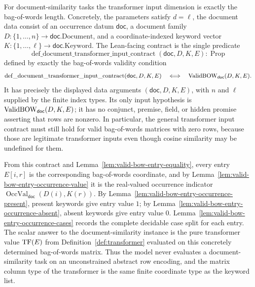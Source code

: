 \begin{definition}
  \label{def:document-transformer-input-contract}
  For document-similarity tasks the transformer input dimension is exactly the
  bag-of-words length.  Concretely, the parameters satisfy $d=\ell$, the
  document data consist of an occurrence datum $\mathsf{doc}$, a document
  family $D:\{1,\ldots,n\}\to\mathsf{doc}.\mathrm{Document}$, and a coordinate-indexed
  keyword vector $K:\{1,\ldots,\ell\}\to\mathsf{doc}.\mathrm{Keyword}$.
  The Lean-facing contract is the single predicate
  \[
    \operatorname{def\_document\_transformer\_input\_contract}
      (\mathsf{doc},D,K,E) : \operatorname{Prop}
  \]
  defined by exactly the bag-of-words validity condition
  \[
    \operatorname{def\_document\_transformer\_input\_contract}
      (\mathsf{doc},D,K,E)
      \quad\Longleftrightarrow\quad
    \operatorname{ValidBOW}_{\mathsf{doc}}(D,K,E).
  \]
  It has precisely the displayed data arguments $(\mathsf{doc},D,K,E)$, with
  $n$ and $\ell$ supplied by the finite index types.  Its only input hypothesis
  is $\operatorname{ValidBOW}_{\mathsf{doc}}(D,K,E)$; it has no conjunct, premise, field, or
  hidden promise asserting that rows are nonzero.  In particular, the general
  transformer input contract must still hold for valid bag-of-words matrices
  with zero rows, because those are legitimate transformer inputs even though
  cosine similarity may be undefined for them.

  From this contract and Lemma~\ref{lem:valid-bow-entry-equality}, every
  entry $E[i,r]$ is the
  corresponding bag-of-words coordinate, and by
  Lemma~\ref{lem:valid-bow-entry-occurrence-value} it is the real-valued
  occurrence indicator
  $\operatorname{OccVal}_{\mathsf{doc}}(D(i),K(r))$.  By
  Lemma~\ref{lem:valid-bow-entry-occurrence-present}, present keywords give
  entry value $1$; by
  Lemma~\ref{lem:valid-bow-entry-occurrence-absent}, absent keywords give
  entry value $0$.  Lemma~\ref{lem:valid-bow-entry-occurrence-cases} records
  the complete decidable case split for each entry.
  The scalar answer to the document-similarity instance is the pure transformer
  value ${\rm TF}(E)$ from Definition~\ref{def:transformer} evaluated on this
  concretely determined bag-of-words matrix.  Thus the model never evaluates a
  document-similarity task on an unconstrained abstract row encoding, and the
  matrix column type of the transformer is the same finite coordinate type as
  the keyword list.
\end{definition}

